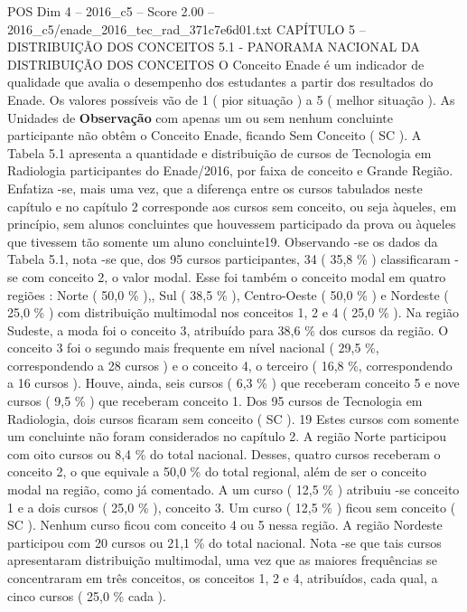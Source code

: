\begin{textsample}{POS Dim 4 – 2016\_c5 – Score 2.00 – 2016\_c5/enade\_2016\_tec\_rad\_371c7e6d01.txt}  \label{ex:f4_pos_110}
CAPÍTULO 5 – DISTRIBUIÇÃO DOS CONCEITOS 5.1 - PANORAMA NACIONAL DA DISTRIBUIÇÃO DOS CONCEITOS O Conceito Enade é um indicador de qualidade que avalia o desempenho dos estudantes a partir dos resultados do Enade.
Os valores possíveis vão de 1 ( pior situação ) a 5 ( melhor situação ).
As Unidades de \textbf{Observação} com apenas um ou sem nenhum concluinte participante não obtêm o Conceito Enade, ficando Sem Conceito ( SC ).
A Tabela 5.1 apresenta a quantidade e distribuição de cursos de Tecnologia em Radiologia participantes do Enade/2016, por faixa de conceito e Grande Região.
Enfatiza -se, mais uma vez, que a diferença entre os cursos tabulados neste capítulo e no capítulo 2 corresponde aos cursos sem conceito, ou seja àqueles, em princípio, sem alunos concluintes que houvessem participado da prova ou àqueles que tivessem tão somente um aluno concluinte19.
Observando -se os dados da Tabela 5.1, nota -se que, dos 95 cursos participantes, 34 ( 35,8 \% ) classificaram -se com conceito 2, o valor modal.
Esse foi também o conceito modal em quatro regiões : Norte ( 50,0 \% ),, Sul ( 38,5 \% ), Centro-Oeste ( 50,0 \% ) e Nordeste ( 25,0 \% ) com distribuição multimodal nos conceitos 1, 2 e 4 ( 25,0 \% ).
Na região Sudeste, a moda foi o conceito 3, atribuído para 38,6 \% dos cursos da região.
O conceito 3 foi o segundo mais frequente em nível nacional ( 29,5 \%, correspondendo a 28 cursos ) e o conceito 4, o terceiro ( 16,8 \%, correspondendo a 16 cursos ).
Houve, ainda, seis cursos ( 6,3 \% ) que receberam conceito 5 e nove cursos ( 9,5 \% ) que receberam conceito 1.
Dos 95 cursos de Tecnologia em Radiologia, dois cursos ficaram sem conceito ( SC ). 19 Estes cursos com somente um concluinte não foram considerados no capítulo 2.
A região Norte participou com oito cursos ou 8,4 \% do total nacional.
Desses, quatro cursos receberam o conceito 2, o que equivale a 50,0 \% do total regional, além de ser o conceito modal na região, como já comentado.
A um curso ( 12,5 \% ) atribuiu -se conceito 1 e a dois cursos ( 25,0 \% ), conceito 3.
Um curso ( 12,5 \% ) ficou sem conceito ( SC ).
Nenhum curso ficou com conceito 4 ou 5 nessa região.
A região Nordeste participou com 20 cursos ou 21,1 \% do total nacional.
Nota -se que tais cursos apresentaram distribuição multimodal, uma vez que as maiores frequências se concentraram em três conceitos, os conceitos 1, 2 e 4, atribuídos, cada qual, a cinco cursos ( 25,0 \% cada ).

\end{textsample}
